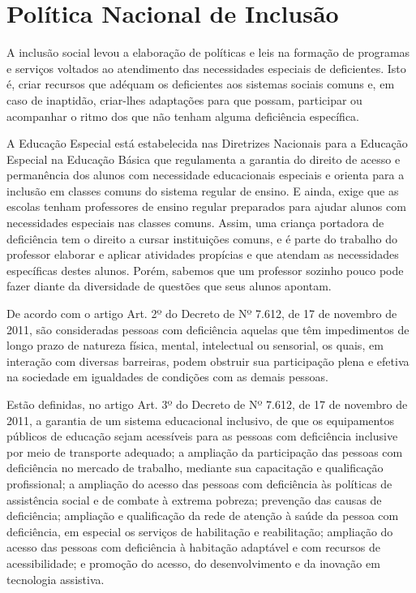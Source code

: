 \documentclass[brasil]{abnt}
\begin{document}
			
\chapter{Política Nacional de Inclusão}
	A inclusão social levou a elaboração de políticas e leis na formação de programas e serviços voltados ao atendimento das necessidades especiais de deficientes. Isto é, criar recursos que 
	adéquam os deficientes aos sistemas sociais comuns e, em caso de inaptidão, criar-lhes adaptações para que possam, participar ou acompanhar o ritmo dos que não tenham alguma deficiência específica. 
	
	A Educação Especial está estabelecida nas Diretrizes Nacionais para a Educação Especial na Educação Básica que regulamenta a garantia do direito de acesso e permanência dos alunos com necessidade 
	educacionais especiais e orienta para a inclusão em classes comuns do sistema regular de ensino. E ainda, exige que as escolas tenham professores de ensino regular preparados para ajudar alunos com 
	necessidades especiais nas classes comuns. Assim, uma criança portadora de deficiência tem o direito a cursar instituições comuns, e é parte do trabalho do professor elaborar e aplicar atividades 
	propícias e que atendam as necessidades específicas destes alunos. Porém, sabemos que um professor sozinho pouco pode fazer diante da diversidade de questões que seus alunos apontam. 
		
	De acordo com o artigo Art. 2º do Decreto de Nº 7.612, de 17 de novembro de 2011, são consideradas pessoas com deficiência aquelas que têm impedimentos de longo prazo de natureza física, mental, 
	intelectual ou sensorial, os quais, em interação com diversas barreiras, podem obstruir sua participação plena e efetiva na sociedade em igualdades de condições com as demais pessoas. 
	
	Estão definidas, no artigo Art. 3º do Decreto de Nº 7.612, de 17 de novembro de 2011, a garantia de um sistema educacional inclusivo, de que os equipamentos públicos de educação sejam acessíveis para as pessoas 
	com deficiência inclusive por meio de transporte adequado; a ampliação da participação das pessoas com deficiência no mercado de trabalho, mediante sua capacitação e qualificação profissional; a ampliação 
	do acesso das pessoas com deficiência às políticas de assistência social e de combate à extrema pobreza; prevenção das causas de deficiência; ampliação e qualificação da rede de atenção à saúde da pessoa 
	com deficiência, em especial os serviços de habilitação e reabilitação; ampliação do acesso das pessoas com deficiência à habitação adaptável e com recursos de acessibilidade; e promoção do acesso, do 
	desenvolvimento e da inovação em tecnologia assistiva. 
		
\end{document}
